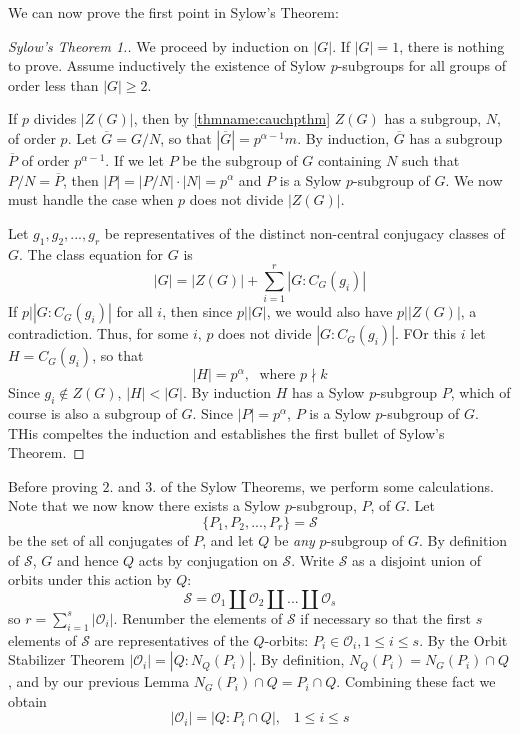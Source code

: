 We can now prove the first point in Sylow's Theorem:

\begin{proof}[Sylow's Theorem 1.]
    We proceed by induction on $|G|$. If $|G| = 1$, there is nothing to prove. Assume inductively the existence of Sylow $p$-subgroups for all groups of order less than $|G| \geq 2$.

    If $p$ divides $|Z(G)|$, then by \ref{thmname:cauchpthm} $Z(G)$ has a subgroup, $N$, of order $p$. Let $\overline{G} = G/N$, so that $|\overline{G}| = p^{\alpha-1}m$. By induction, $\overline{G}$ has a subgroup $\overline{P}$ of order $p^{\alpha-1}$. If we let $P$ be the subgroup of $G$ containing $N$ such that $P/N =\overline{P}$, then $|P| = |P/N|\cdot|N| = p^{\alpha}$ and $P$ is a Sylow $p$-subgroup of $G$. We now must handle the case when $p$ does not divide $|Z(G)|$.

    Let $g_1,g_2,...,g_r$ be representatives of the distinct non-central conjugacy classes of $G$. The class equation for $G$ is \begin{equation*}
        |G| = |Z(G)| + \sum\limits_{i=1}^r|G:C_G(g_i)|
    \end{equation*}
    If $p\vert |G:C_G(g_i)|$ for all $i$, then since $p\vert |G|$, we would also have $p\vert|Z(G)|$, a contradiction. Thus, for some $i$, $p$ does not divide $|G:C_G(g_i)|$. FOr this $i$ let $H = C_G(g_i)$, so that \begin{equation*}
        |H| = p^{\alpha}, \;\text{ where }p\nmid k
    \end{equation*}
    Since $g_i \notin Z(G)$, $|H| < |G|$. By induction $H$ has a Sylow $p$-subgroup $P$, which of course is also a subgroup of $G$. Since $|P| = p^{\alpha}$, $P$ is a Sylow $p$-subgroup of $G$. THis compeltes the induction and establishes the first bullet of Sylow's Theorem.
\end{proof}

Before proving $2.$ and $3.$ of the Sylow Theorems, we perform some calculations. Note that we now know there exists a Sylow $p$-subgroup, $P$, of $G$. Let \begin{equation*}
    \{P_1,P_2,...,P_r\} = \mathcal{S}
\end{equation*}
be the set of all conjugates of $P$, and let $Q$ be \emph{any} $p$-subgroup of $G$. By definition of $\mathcal{S}$, $G$ and hence $Q$ acts by conjugation on $\mathcal{S}$. Write $\mathcal{S}$ as a disjoint union of orbits under this action by $Q$: \begin{equation*}
    \mathcal{S} = \mathcal{O}_1\coprod\mathcal{O}_2\coprod...\coprod\mathcal{O}_s
\end{equation*}
so $r = \sum_{i=1}^s|\mathcal{O}_i|$. Renumber the elements of $\mathcal{S}$ if necessary so that the first $s$ elements of $\mathcal{S}$ are representatives of the $Q$-orbits: $P_i\in\mathcal{O}_i, 1\leq i \leq s$. By the Orbit Stabilizer Theorem $|\mathcal{O}_i| = |Q:N_Q(P_i)|$. By definition, $N_Q(P_i) = N_G(P_i)\cap Q$, and by our previous Lemma $N_G(P_i)\cap Q = P_i\cap Q$. Combining these fact we obtain \begin{equation*}
    |\mathcal{O}_i| = |Q:P_i\cap Q|,\;\;\; 1 \leq i \leq s
\end{equation*}

